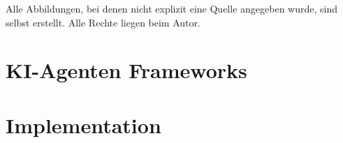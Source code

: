 

\setlength{\headheight}{27.35pt} %
\setlength{\footheight}{18.85pt}  %
\setlength{\footskip}{30pt}        %

% 
\pagestyle{empty}



\newpage
\pagestyle{scrheadings}
\thispagestyle{firstPage}
\tableofcontents
\newpage
\thispagestyle{firstPage}
\listoffigures
Alle Abbildungen, bei denen nicht explizit eine Quelle angegeben wurde, sind selbst erstellt. Alle Rechte liegen beim Autor.
\newpage
\thispagestyle{firstPage}
\lstlistoflistings
\newpage
\thispagestyle{firstPage}
\listoftables  
\newpage
\setcounter{page}{1}
\section{KI-Agenten Frameworks}

\section{Implementation}

\newpage
\printbibliography
\thispagestyle{firstPage}
\appendix

